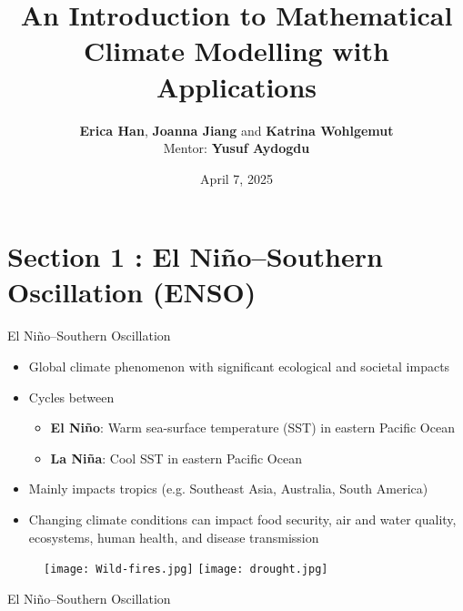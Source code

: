 \documentclass[9pt,xcolor=dvipsnames]{beamer}
\title[]{An Introduction to Mathematical Climate Modelling with Applications}
\author[  Han \& Jiang \&  Wohlgemut ]{\Large \textbf{Erica Han}, \textbf{Joanna Jiang} and \textbf{Katrina Wohlgemut}
\vspace{0.5cm} \\
Mentor:  \textbf{Yusuf Aydogdu}}
\institute[UW]
{\textcolor{red}{\\
\Large  Faculty of  Mathematics\\
\vspace{0.5cm}
University of Waterloo, Ontario, Canada
 } \\ 
\vspace{0.5cm}
{\Large \color{blue} Women in Math Directed Reading Program}
}
\date{April 7, 2025}
\begin{document}
\maketitle

\section{Section 1 : El Niño--Southern Oscillation (ENSO)}

\begin{frame}{El Niño--Southern Oscillation}
\begin{itemize}
    \item Global climate phenomenon with significant ecological and societal impacts
    \item Cycles between
    \begin{itemize}
        \item \textbf{El Niño}: Warm sea-surface temperature (SST) in eastern Pacific Ocean
        \item \textbf{La Niña}: Cool SST in eastern Pacific Ocean
    \end{itemize}
    \item Mainly impacts tropics (e.g. Southeast Asia, Australia, South America)
    \item Changing climate conditions can impact food security, air and water quality, ecosystems, human health, and disease transmission
\end{itemize}

\begin{figure}
    \centering
    \texttt{[image: Wild-fires.jpg]}
    \texttt{[image: drought.jpg]}
\end{figure}
\end{frame}

\begin{frame}{El Niño--Southern Oscillation}
     \begin{center}
\end{center}
\end{frame}
\end{document}
